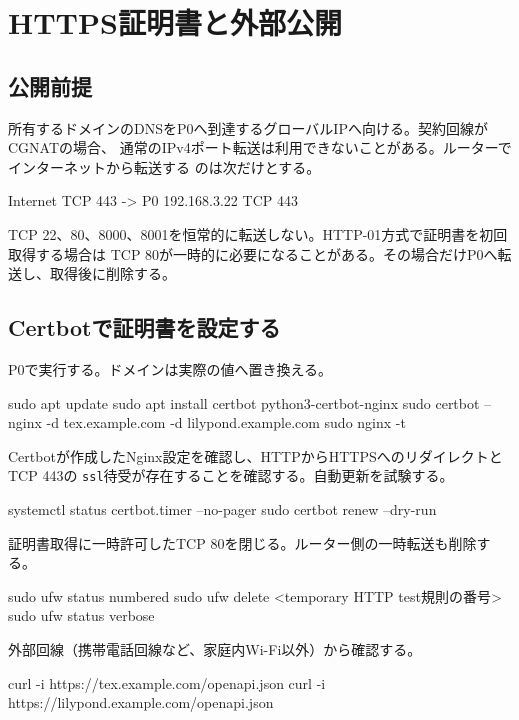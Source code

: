 \documentclass[uplatex,a4paper,11pt]{jsarticle}
\begin{document}
\section{HTTPS証明書と外部公開}

\subsection{公開前提}

所有するドメインのDNSをP0へ到達するグローバルIPへ向ける。契約回線がCGNATの場合、
通常のIPv4ポート転送は利用できないことがある。ルーターでインターネットから転送する
のは次だけとする。

\begin{command}
Internet TCP 443 -> P0 192.168.3.22 TCP 443
\end{command}

TCP 22、80、8000、8001を恒常的に転送しない。HTTP-01方式で証明書を初回取得する場合は
TCP 80が一時的に必要になることがある。その場合だけP0へ転送し、取得後に削除する。

\subsection{Certbotで証明書を設定する}

P0で実行する。ドメインは実際の値へ置き換える。

\begin{command}
sudo apt update
sudo apt install certbot python3-certbot-nginx
sudo certbot --nginx -d tex.example.com -d lilypond.example.com
sudo nginx -t
\end{command}

Certbotが作成したNginx設定を確認し、HTTPからHTTPSへのリダイレクトとTCP 443の
\texttt{ssl}待受が存在することを確認する。自動更新を試験する。

\begin{command}
systemctl status certbot.timer --no-pager
sudo certbot renew --dry-run
\end{command}

証明書取得に一時許可したTCP 80を閉じる。ルーター側の一時転送も削除する。

\begin{command}
sudo ufw status numbered
sudo ufw delete <temporary HTTP test規則の番号>
sudo ufw status verbose
\end{command}

外部回線（携帯電話回線など、家庭内Wi-Fi以外）から確認する。

\begin{command}
curl -i https://tex.example.com/openapi.json
curl -i https://lilypond.example.com/openapi.json
\end{command}
\end{document}
